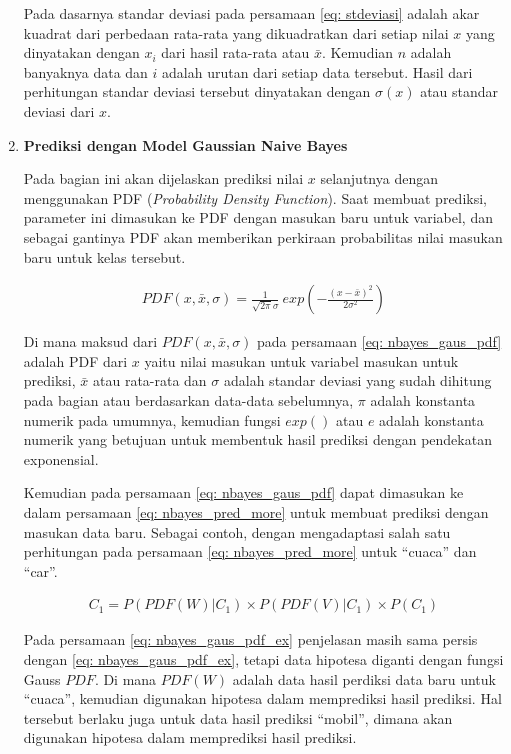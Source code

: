 \begin{enumerate}[label=\textbf{\arabic*).}]
	Pada dasarnya standar deviasi pada persamaan \ref{eq: stdeviasi} adalah akar kuadrat dari perbedaan rata-rata yang dikuadratkan dari setiap nilai $x$ yang dinyatakan dengan $x_{i}$ dari hasil rata-rata atau $\bar x$. Kemudian $n$ adalah banyaknya data dan $i$ adalah urutan dari setiap data tersebut. Hasil dari perhitungan standar deviasi tersebut dinyatakan dengan $\sigma(x)$ atau standar deviasi dari $x$.

	\item \textbf{Prediksi dengan Model Gaussian Naive Bayes}

	Pada bagian ini akan dijelaskan prediksi nilai $x$ selanjutnya dengan menggunakan  PDF (\textit{Probability Density Function}). Saat membuat prediksi, parameter ini dimasukan ke  PDF dengan masukan baru untuk variabel, dan sebagai gantinya  PDF akan memberikan perkiraan probabilitas nilai masukan baru untuk kelas tersebut.
	
	\begin{equation}\label{eq: nbayes_gaus_pdf}
	\begin{split}
	PDF(x, \bar{x}, \sigma) = \frac{1}{\sqrt{2 \pi} \sigma}\ exp \left(-\frac{(x - \bar{x})^2}{2 \sigma^2}\right)
	\end{split}
	\end{equation}
	
	Di mana maksud dari $PDF(x, \bar{x}, \sigma)$ pada persamaan \ref{eq: nbayes_gaus_pdf} adalah  PDF dari $x$ yaitu nilai masukan untuk variabel masukan untuk prediksi, $\bar x$ atau rata-rata dan $\sigma$ adalah standar deviasi yang sudah dihitung pada bagian atau berdasarkan data-data sebelumnya, $\pi$ adalah konstanta numerik pada umumnya, kemudian fungsi $exp()$ atau $e$ adalah konstanta numerik yang betujuan untuk membentuk hasil prediksi dengan pendekatan exponensial.
	\vspace{1ex}
	
	Kemudian pada persamaan \ref{eq: nbayes_gaus_pdf} dapat dimasukan ke dalam persamaan \ref{eq: nbayes_pred_more} untuk membuat prediksi dengan masukan data baru. Sebagai contoh, dengan mengadaptasi salah satu perhitungan pada persamaan \ref{eq: nbayes_pred_more} untuk ``cuaca'' dan ``car''.
	
	\begin{equation}\label{eq: nbayes_gaus_pdf_ex}
	\begin{split}
	C_{1} = P(PDF(W)|C_{1}) \times P(PDF(V)|C_{1}) \times P(C_{1})
	\end{split}
	\end{equation}
	
	Pada persamaan \ref{eq: nbayes_gaus_pdf_ex} penjelasan masih sama persis dengan \ref{eq: nbayes_gaus_pdf_ex}, tetapi data hipotesa diganti dengan fungsi Gauss $PDF$. Di mana $PDF(W)$ adalah data hasil perdiksi data baru untuk ``cuaca'', kemudian digunakan hipotesa dalam memprediksi hasil prediksi. Hal tersebut berlaku juga untuk data hasil prediksi ``mobil'', dimana akan digunakan hipotesa dalam memprediksi hasil prediksi.
\end{enumerate}

